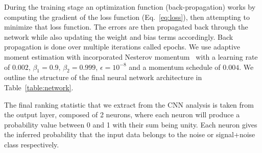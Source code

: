 \documentclass[%
showpacs,
 amsmath,amssymb,
 aps,
 twocolumn,
 prl,
 reprint,
floatfix,
]{revtex4-1}
\begin{document}
%
%

%
%
During the training stage an optimization function (back-propagation) works by
computing the gradient of the loss function (Eq.~\ref{eq:loss}), then
attempting to minimize that loss function. The errors are then propagated back
through the network while also updating the weight and bias terms
accordingly.  Back propagation is done over multiple iterations called epochs.
We use adaptive moment estimation with incorporated Nesterov
momentum~\cite{dozat2016incorporating} with a learning rate of $0.002$,
$\beta_{1}=0.9$, $\beta_{2}=0.999$, $\epsilon = 10^{-8}$ and a momentum
schedule of $0.004$. We outline the structure of the final neural network
architecture in Table~\ref{table:network}.



%
%
The final ranking statistic that we extract from the \ac{CNN} analysis is taken
from the output layer, composed of 2 neurons, where each neuron will
produce a probability value between 0 and 1 with their sum being unity. Each
neuron gives the inferred probability that the input data belongs to the noise
or signal+noise class respectively.
\end{document}
